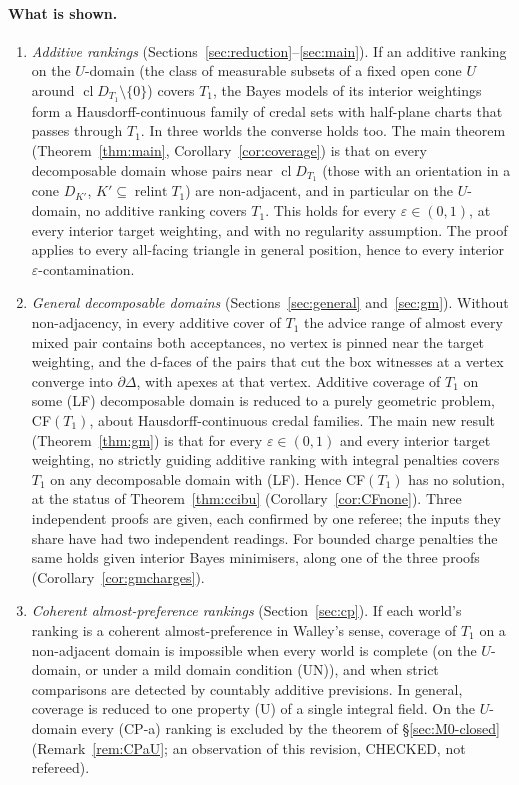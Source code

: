 \documentclass[11pt]{article}
\theoremstyle{definition}
\theoremstyle{remark}
\newcommand{\cl}{\operatorname{cl}}
\newcommand{\relint}{\operatorname{relint}}
\begin{document}
\paragraph{What is shown.}
\begin{enumerate}[leftmargin=*]
\item \emph{Additive rankings} (Sections~\ref{sec:reduction}--\ref{sec:main}). If an additive ranking on the $U$-domain (the class of measurable subsets of a fixed open cone $U$ around $\cl D_{T_1}\setminus\{0\}$) covers $T_1$, the Bayes models of its interior weightings form a Hausdorff-continuous family of credal sets with half-plane charts that passes through $T_1$. In three worlds the converse holds too. The main theorem (Theorem~\ref{thm:main}, Corollary~\ref{cor:coverage}) is that on every decomposable domain whose pairs near $\cl D_{T_1}$ (those with an orientation in a cone $D_{K'}$, $K'\subseteq\relint T_1$) are non-adjacent, and in particular on the $U$-domain, no additive ranking covers $T_1$. This holds for every $\varepsilon\in(0,1)$, at every interior target weighting, and with no regularity assumption. The proof applies to every all-facing triangle in general position, hence to every interior $\varepsilon$-contamination.
\item \emph{General decomposable domains} (Sections~\ref{sec:general} and~\ref{sec:gm}). Without non-adjacency, in every additive cover of $T_1$ the advice range of almost every mixed pair contains both acceptances, no vertex is pinned near the target weighting, and the d-faces of the pairs that cut the box witnesses at a vertex converge into $\partial\Delta$, with apexes at that vertex. Additive coverage of $T_1$ on some (LF) decomposable domain is reduced to a purely geometric problem, CF$(T_1)$, about Hausdorff-continuous credal families. The main new result (Theorem~\ref{thm:gm}) is that for every $\varepsilon\in(0,1)$ and every interior target weighting, no strictly guiding additive ranking with integral penalties covers $T_1$ on any decomposable domain with (LF). Hence CF$(T_1)$ has no solution, at the status of Theorem~\ref{thm:ccibu} (Corollary~\ref{cor:CFnone}). Three independent proofs are given, each confirmed by one referee; the inputs they share have had two independent readings. For bounded charge penalties the same holds given interior Bayes minimisers, along one of the three proofs (Corollary~\ref{cor:gmcharges}).
\item \emph{Coherent almost-preference rankings} (Section~\ref{sec:cp}). If each world's ranking is a coherent almost-preference in Walley's sense, coverage of $T_1$ on a non-adjacent domain is impossible when every world is complete (on the $U$-domain, or under a mild domain condition (UN)), and when strict comparisons are detected by countably additive previsions. In general, coverage is reduced to one property (U) of a single integral field. On the $U$-domain every (CP-a) ranking is excluded by the theorem of \S\ref{sec:M0-closed} (Remark~\ref{rem:CPaU}; an observation of this revision, CHECKED, not refereed).

\end{enumerate}
\end{document}
